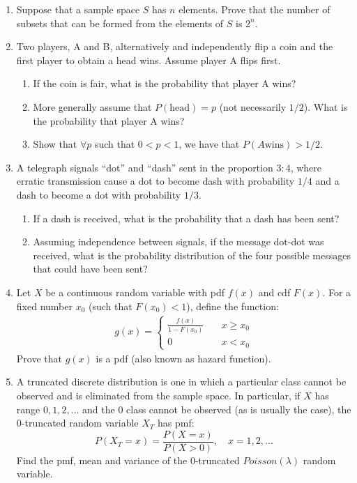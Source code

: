 \documentclass[a4paper]{article}
\begin{document}
\begin{enumerate}
  \item Suppose that a sample space $S$ has $n$ elements. Prove that the number
  of subsets that can be formed from the elements of $S$ is $2^n$.
  \item Two players, A and B, alternatively and independently flip a coin and
  the first player to obtain a head wins. Assume player A flips first.
    \begin{enumerate}
      \item If the coin is fair, what is the probability that player A wins?
      \item More generally assume that $P(\text{head})=p$ (not necessarily
      $1/2$). What is the probability that player A wins?
      \item Show that $\forall p$ such that $0<p<1$, we have that $P(A\text{
      wins})>1/2$.
    \end{enumerate}
  \item A telegraph signals ``dot'' and ``dash'' sent in the proportion $3 : 4$,
  where erratic transmission cause a dot to become dash with probability $1/4$
  and a dash to become a dot with probability $1/3$.
    \begin{enumerate}
      \item If a dash is received, what is the probability that a dash has been
      sent?
      \item Assuming independence between signals, if the message dot-dot was
      received, what is the probability distribution of the four possible
      messages that could have been sent?
    \end{enumerate}
  \item Let $X$ be a continuous random variable with pdf $f(x)$ and cdf $F(x)$.
  For a fixed number $x_0$ (such that $F(x_0)<1$), define the function:
    \begin{align} g(x)=
      \begin{cases}
        \frac{f(x)}{1-F(x_0)} \quad &x\geq x_0 \\
        0 \quad &x<x_0
      \end{cases}
    \end{align}
  Prove that $g(x)$ is a pdf (also known as hazard function).
  \item A truncated discrete distribution is one in which a particular class
  cannot be observed and is eliminated from the sample space. In particular, if
  $X$ has range $0,1,2,\ldots$ and the $0$ class cannot be observed (as is
  usually the case), the $0$-truncated random variable $X_T$ has pmf:
  $$P(X_T=x)=\frac{P(X=x)}{P(X>0)}, \quad x=1,2,\ldots$$
  Find the pmf, mean and variance of the $0$-truncated $Poisson(\lambda)$ random
  variable.
\end{enumerate}
\end{document}
